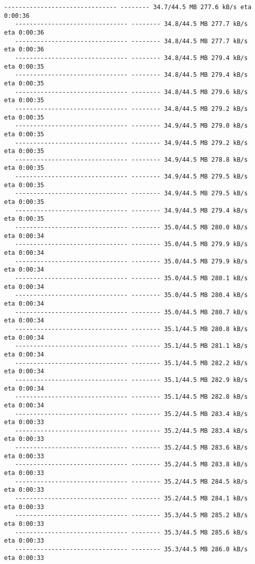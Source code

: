 \documentclass[11pt]{article}
\begin{document}
\begin{Verbatim}[commandchars=\\\{\}]
   ------------------------------- -------- 34.7/44.5 MB 277.6 kB/s eta 0:00:36
   ------------------------------- -------- 34.8/44.5 MB 277.7 kB/s eta 0:00:36
   ------------------------------- -------- 34.8/44.5 MB 277.7 kB/s eta 0:00:36
   ------------------------------- -------- 34.8/44.5 MB 279.4 kB/s eta 0:00:35
   ------------------------------- -------- 34.8/44.5 MB 279.4 kB/s eta 0:00:35
   ------------------------------- -------- 34.8/44.5 MB 279.6 kB/s eta 0:00:35
   ------------------------------- -------- 34.8/44.5 MB 279.2 kB/s eta 0:00:35
   ------------------------------- -------- 34.9/44.5 MB 279.0 kB/s eta 0:00:35
   ------------------------------- -------- 34.9/44.5 MB 279.2 kB/s eta 0:00:35
   ------------------------------- -------- 34.9/44.5 MB 278.8 kB/s eta 0:00:35
   ------------------------------- -------- 34.9/44.5 MB 279.5 kB/s eta 0:00:35
   ------------------------------- -------- 34.9/44.5 MB 279.5 kB/s eta 0:00:35
   ------------------------------- -------- 34.9/44.5 MB 279.4 kB/s eta 0:00:35
   ------------------------------- -------- 35.0/44.5 MB 280.0 kB/s eta 0:00:34
   ------------------------------- -------- 35.0/44.5 MB 279.9 kB/s eta 0:00:34
   ------------------------------- -------- 35.0/44.5 MB 279.9 kB/s eta 0:00:34
   ------------------------------- -------- 35.0/44.5 MB 280.1 kB/s eta 0:00:34
   ------------------------------- -------- 35.0/44.5 MB 280.4 kB/s eta 0:00:34
   ------------------------------- -------- 35.0/44.5 MB 280.7 kB/s eta 0:00:34
   ------------------------------- -------- 35.1/44.5 MB 280.8 kB/s eta 0:00:34
   ------------------------------- -------- 35.1/44.5 MB 281.1 kB/s eta 0:00:34
   ------------------------------- -------- 35.1/44.5 MB 282.2 kB/s eta 0:00:34
   ------------------------------- -------- 35.1/44.5 MB 282.9 kB/s eta 0:00:34
   ------------------------------- -------- 35.1/44.5 MB 282.8 kB/s eta 0:00:34
   ------------------------------- -------- 35.2/44.5 MB 283.4 kB/s eta 0:00:33
   ------------------------------- -------- 35.2/44.5 MB 283.4 kB/s eta 0:00:33
   ------------------------------- -------- 35.2/44.5 MB 283.6 kB/s eta 0:00:33
   ------------------------------- -------- 35.2/44.5 MB 283.8 kB/s eta 0:00:33
   ------------------------------- -------- 35.2/44.5 MB 284.5 kB/s eta 0:00:33
   ------------------------------- -------- 35.2/44.5 MB 284.1 kB/s eta 0:00:33
   ------------------------------- -------- 35.3/44.5 MB 285.2 kB/s eta 0:00:33
   ------------------------------- -------- 35.3/44.5 MB 285.6 kB/s eta 0:00:33
   ------------------------------- -------- 35.3/44.5 MB 286.0 kB/s eta 0:00:33

\end{Verbatim}
\end{document}
